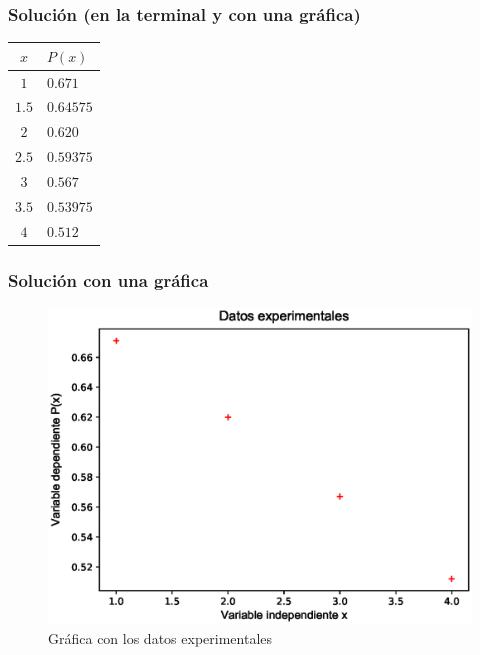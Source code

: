 \documentclass[12pt]{beamer}
\begin{document}
\begin{frame}[fragile]
\frametitle{Solución (en la terminal y con una gráfica)}
\begin{table}
\centering
\renewcommand{\arraystretch}{0.9}
\begin{tabular}{c | l}
$x$ & $P (x)$ \\
\hline $1$   & $0.671$ \\
\hline $1.5$ & $0.64575$ \\
\hline $2$   & $0.620$ \\
\hline $2.5$ & $0.59375$ \\
\hline $3$   & $0.567$ \\
\hline $3.5$ & $0.53975$ \\
\hline $4$   & $0.512$
\end{tabular}
\end{table}
\end{frame}
\begin{frame}
\frametitle{Solución con una gráfica}
\begin{figure}
	\centering
	\includegraphics[scale=0.5]{Imagenes/InterpLagrangen3_01.eps}
	\caption{Gráfica con los datos experimentales}
\end{figure}
\end{frame}
\end{document}
